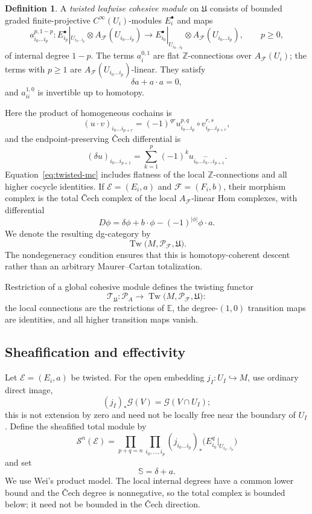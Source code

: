 \documentclass[12pt]{amsart}
\theoremstyle{definition}
\newtheorem{defn}[thm]{Definition}
\theoremstyle{remark}
\numberwithin{equation}{section}
\newcommand{\CF}{{\mathcal F}}
\newcommand{\A}{{A}}
\newcommand{\Z}{{\mathbb{Z}}}
\newcommand{\1}{{\mathbb{1}}}
\begin{document}
\begin{defn}\label{def:twisted-cohesive}
A \emph{twisted leafwise cohesive module} on $\mathfrak U$ consists of
bounded graded finite-projective $C^\infty(U_i)$-modules
$E_i^\bullet$ and maps
\[
 a^{p,1-p}_{i_0\ldots i_p}:
 E_{i_p}^\bullet|_{U_{i_0\ldots i_p}}
 \otimes\A_{\CF}(U_{i_0\ldots i_p})
 \longrightarrow
 E_{i_0}^\bullet|_{U_{i_0\ldots i_p}}
 \otimes\A_{\CF}(U_{i_0\ldots i_p}),
 \qquad p\geq 0,
\]
of internal degree $1-p$.  The terms $a_i^{0,1}$ are flat
$\Z$-connections over $\A_{\CF}(U_i)$; the terms with $p\geq1$ are
$\A_{\CF}(U_{i_0\ldots i_p})$-linear.  They satisfy
\begin{equation}
 \delta a+a\cdot a=0,
 \label{eq:twisted-mc}
\end{equation}
and $a_{ii}^{1,0}$ is invertible up to homotopy.
\end{defn}

Here the product of homogeneous cochains is
\[
 (u\cdot v)_{i_0\ldots i_{p+r}}
 =
 (-1)^{qr}
 u^{p,q}_{i_0\ldots i_p}
 \circ
 v^{r,s}_{i_p\ldots i_{p+r}},
\]
and the endpoint-preserving \v{C}ech differential is
\[
 (\delta u)_{i_0\ldots i_{p+1}}
 =
 \sum_{k=1}^{p}(-1)^k
 u_{i_0\ldots\widehat{i_k}\ldots i_{p+1}}.
\]
Equation~\eqref{eq:twisted-mc} includes flatness of the local
$\Z$-connections and all higher cocycle identities.  If
$\mathcal E=(E_i,a)$ and $\mathcal F=(F_i,b)$, their morphism complex
is the total \v{C}ech complex of the local $\A_{\CF}$-linear Hom
complexes, with differential
\[
 D\phi=\delta\phi+b\cdot\phi-(-1)^{|\phi|}\phi\cdot a.
\]
We denote the resulting dg-category by
\[
 \operatorname{Tw}
 \bigl(M,\mathcal P_{\CF},\mathfrak U\bigr).
\]
The nondegeneracy condition ensures that this is homotopy-coherent
descent rather than an arbitrary Maurer--Cartan totalization.

Restriction of a global cohesive module defines the twisting functor
\[
 \mathcal T_{\mathfrak U}:
 \mathcal P_{\A}
 \longrightarrow
 \operatorname{Tw}
 \bigl(M,\mathcal P_{\CF},\mathfrak U\bigr):
\]
the local connections are the restrictions of $\mathbb E$, the
degree-$(1,0)$ transition maps are identities, and all higher
transition maps vanish.

\subsection{Sheafification and effectivity}

Let $\mathcal E=(E_i,a)$ be twisted.  For the open embedding
$j_I:U_I\hookrightarrow M$, use ordinary direct image,
\[
 (j_I)_*\mathcal G(V)=\mathcal G(V\cap U_I);
\]
this is not extension by zero and need not be locally free near the
boundary of $U_I$.  Define the sheafified total module by
\begin{equation}
 \mathcal S^n(\mathcal E)
 =
 \prod_{p+q=n}\prod_{i_0,\ldots,i_p}
 (j_{i_0\ldots i_p})_*
 \bigl(E_{i_0}^q|_{U_{i_0\ldots i_p}}\bigr)
 \label{eq:twisted-sheafification}
\end{equation}
and set
\[
 \mathbb S=\delta+a.
\]
We use Wei's product model.  The local internal degrees have a
common lower bound and the \v{C}ech degree is nonnegative, so the total
complex is bounded below; it need not be bounded in the \v{C}ech
direction.
\end{document}
